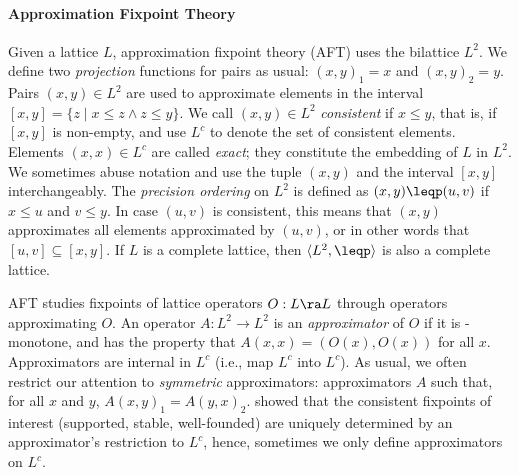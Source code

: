 \paragraph{Approximation Fixpoint Theory}


Given a lattice $L$, approximation fixpoint theory (AFT) \cite{DeneckerMT00} uses the bilattice 
$L^2$.  We define two \emph{projection} functions for pairs as usual:
$(x,y)_1=x$ and $(x,y)_2=y$.  Pairs $(x,y)\in L^2$ are used to
approximate elements in the interval $[x,y] = \{z\mid x\leq
z\wedge z\leq y\}$. We call $(x,y)\in L^2$ \emph{consistent} if $x\leq 
y$, that is, if $[x,y]$ is non-empty, and use $L^c$ to denote the set
of consistent elements. Elements $(x,x) \in L^c$ are called
\emph{exact}; they constitute the embedding of $L$ in $L^2$.  We sometimes abuse notation and use the tuple $(x,y)$
and the interval $[x,y]$ interchangeably.  The \emph{precision
  ordering} on $L^2$ is defined as $(x,y) \leqp (u,v)$ if $x\leq u$
and $v\leq y$. In case $(u,v)$ is consistent, this means that $(x,y)$
approximates all elements approximated by $(u,v)$, or in other words
that $[u,v]\subseteq [x,y]$.  If $L$ is a complete lattice, then
$\langle L^2,\leqp\rangle$ is also a complete lattice.
  


AFT studies fixpoints of lattice operators $O:L\ra L$ through operators approximating $O$.
 An operator $A: L^2\to L^2$  is an \emph{approximator} of $O$ if it is \leqp-monotone,  and has the property that $A(x,x) = (O(x),O(x))$ for all $x$. %
Approximators are internal in $L^c$ (i.e., map $L^c$ into $L^c$).
As usual, we often restrict our attention to \emph{symmetric} approximators: approximators $A$ such that, for all $x$ and $y$, $A(x,y)_1 = A(y,x)_2$.
\citet{DeneckerMT04} showed that the consistent fixpoints of interest (supported, stable, well-founded) are uniquely determined by an approximator's restriction to $L^c$, hence, sometimes we only define approximators on $L^c$. 

